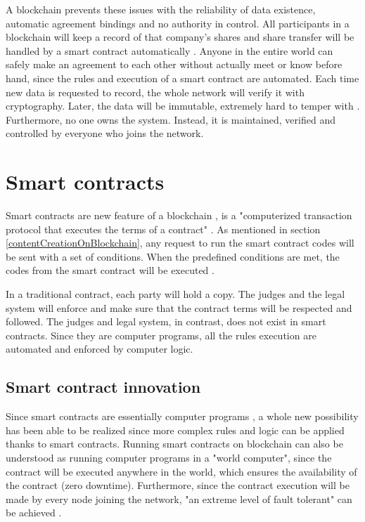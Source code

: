 \documentclass[twoside,draftfooter]{tutthesis} %
\begin{document}
A blockchain prevents these issues with the reliability of data existence, automatic agreement bindings and no authority in control. All participants in a blockchain will keep a record of that company's shares and share transfer will be handled by a smart contract automatically \citep{RefWorks:doc:BlockchainProtocolInClinicalTrials}. Anyone in the entire world can safely make an agreement to each other without actually meet or know before hand, since the rules and execution of a smart contract are automated.  Each time new data is requested to record, the whole network will verify it with cryptography. Later, the data will be immutable, extremely hard to temper with \citep{RefWorks:doc:BitcoinWhitepaper}\citep{RefWorks:doc:EthereumWhitepaper}. Furthermore, no one owns the system. Instead, it is maintained, verified and controlled by everyone who joins the network.

\section{Smart contracts}

Smart contracts are new feature of a blockchain \citep{RefWorks:doc:BlockchainInSustainableEnergySystem}, is a "computerized transaction protocol that executes the terms of a
contract" \citep{SmartContracts}. As mentioned in section \ref{contentCreationOnBlockchain}, any request to run the smart contract codes will be sent with a set of conditions. When the predefined conditions are met, the codes from the smart contract will be executed \citep{RefWorks:doc:MasteringBlockchain}.

In a traditional contract, each party will hold a copy. The judges and the legal system will enforce and make sure that the contract terms will be respected and followed. The judges and legal system, in contrast, does not exist in smart contracts. Since they are computer programs, all the rules execution are automated and enforced by computer logic.

\subsection{Smart contract innovation}

Since smart contracts are essentially computer programs \citep{Ethdocorg:EVM}, a whole new possibility has been able to be realized since more complex rules and logic can be applied thanks to smart contracts. Running smart contracts on blockchain can also be understood as running computer programs in a "world computer", since the contract will be executed anywhere in the world, which ensures the availability of the contract (zero downtime). Furthermore, since the contract execution will be made by every node joining the network, "an extreme level of fault tolerant" can be achieved \citep{Ethdocorg:EVM}.
\end{document}
